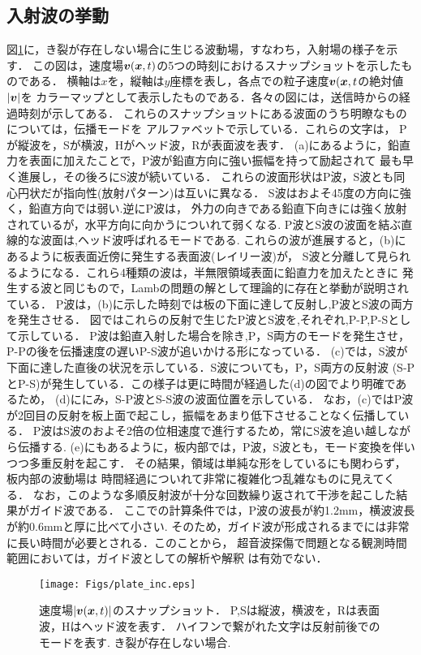 \subsection{入射波の挙動}
図\ref{fig:fig3_1}に，き裂が存在しない場合に生じる波動場，すなわち，入射場の様子を示す．
この図は，速度場$\mbox{\boldmath $v$}(\mbox{\boldmath $x$},t)$の5つの時刻におけるスナップショットを示したものである．
横軸は$x$を，縦軸は$y$座標を表し，各点での粒子速度$\mbox{\boldmath $v$}(\mbox{\boldmath $x$},t$の絶対値$|\mbox{\boldmath $v$}|$を
カラーマップとして表示したものである．各々の図には，送信時からの経過時刻が示してある．
これらのスナップショットにある波面のうち明瞭なものについては，伝播モードを
アルファベットで示している．これらの文字は，
Pが縦波を，Sが横波，Hがヘッド波，Rが表面波を表す．
(a)にあるように，鉛直力を表面に加えたことで，P波が鉛直方向に強い振幅を持って励起されて
最も早く進展し，その後ろにS波が続いている．
これらの波面形状はP波，S波とも同心円状だが指向性(放射パターン)は互いに異なる．
S波はおよそ45度の方向に強く，鉛直方向では弱い.逆にP波は，
外力の向きである鉛直下向きには強く放射されているが，水平方向に向かうについれて弱くなる.
P波とS波の波面を結ぶ直線的な波面は,ヘッド波呼ばれるモードである.
これらの波が進展すると，(b)にあるように板表面近傍に発生する表面波(レイリー波)が，
S波と分離して見られるようになる．これら4種類の波は，半無限領域表面に鉛直力を加えたときに
発生する波と同じもので，Lambの問題の解として理論的に存在と挙動が説明されている．
P波は，(b)に示した時刻では板の下面に達して反射し,P波とS波の両方を発生させる．
図ではこれらの反射で生じたP波とS波を,それぞれ,P-P,P-Sとして示している．
P波は鉛直入射した場合を除き,P，S両方のモードを発生させ，
P-Pの後を伝播速度の遅いP-S波が追いかける形になっている．
(c)では，S波が下面に達した直後の状況を示している．S波についても，P，S両方の反射波
(S-PとP-S)が発生している．この様子は更に時間が経過した(d)の図でより明確であるため，
(d)ににみ，S-P波とS-S波の波面位置を示している．
なお，(c)ではP波が2回目の反射を板上面で起こし，振幅をあまり低下させることなく伝播している．
P波はS波のおよそ2倍の位相速度で進行するため，常にS波を追い越しながら伝播する.
(e)にもあるように，板内部では，P波，S波とも，モード変換を伴いつつ多重反射を起こす．
その結果，領域は単純な形をしているにも関わらず，板内部の波動場は
時間経過についれて非常に複雑化つ乱雑なものに見えてくる．
なお，このような多順反射波が十分な回数繰り返されて干渉を起こした結果がガイド波である．
ここでの計算条件では，P波の波長が約1.2mm，横波波長が約0.6mmと厚に比べて小さい.
そのため，ガイド波が形成されるまでには非常に長い時間が必要とされる．このことから，
超音波探傷で問題となる観測時間範囲においては，ガイド波としての解析や解釈
は有効でない．
\begin{figure}[h]
	\begin{center}
	\texttt{[image: Figs/plate\_inc.eps]} 
	\end{center}
	\caption{
		速度場$|\mbox{\boldmath $v$}(\mbox{\boldmath $x$},t)|$のスナップショット．
		P,Sは縦波，横波を，Rは表面波，Hはヘッド波を表す．
		ハイフンで繋がれた文字は反射前後でのモードを表す. き裂が存在しない場合.
	} 
	\label{fig:fig3_1}
\end{figure}
